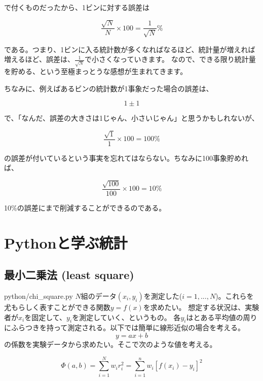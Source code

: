 \documentclass[uplatex]{jreport}
\begin{document}
で付くものだったから、1ビンに対する誤差は

\begin{equation}
  \frac{\sqrt{N}}{N}\times 100 = \frac{1}{\sqrt{N}} \%
\end{equation}

である。つまり、1ビンに入る統計数が多くなればなるほど、統計量が増えれば増えるほど、誤差は、$\frac{1}{\sqrt{N}}$で小さくなっていきます。
なので、できる限り統計量を貯める、という至極まっとうな感想が生まれてきます。

ちなみに、例えばあるビンの統計数が1事象だった場合の誤差は、

\begin{equation}
  1\pm 1
\end{equation}

で、「なんだ、誤差の大きさは1じゃん、小さいじゃん」と思うかもしれないが、

\begin{equation}
  \frac{\sqrt{1}}{1}\times 100 = 100 \%
\end{equation}

の誤差が付いているという事実を忘れてはならない。ちなみに100事象貯めれば、

\begin{equation}
  \frac{\sqrt{100}}{100}\times 100 = 10 \%
\end{equation}

10\%の誤差にまで削減することができるのである。



\chapter{Pythonと学ぶ統計}
\section{最小二乗法 (least square)}
python/chi\_square.py
$N$組のデータ$(x_i,y_i)$を測定した($i=1,...,N$)。これらを尤もらしく表すことができる関数$y=f(x)$を求めたい。
想定する状況は、実験者が$x_i$を固定して、$y_i$を測定していく、というもの。
各$y_i$はとある平均値の周りにふらつきを持って測定される。以下では簡単に線形近似の場合を考える。
\begin{equation}
  y = ax + b
\end{equation}
の係数を実験データから求めたい。そこで次のような値を考える。

\begin{equation}
  \Phi(a,b) = \sum_{i=1}^{N} w_i r_i^{2} = \sum_{i=1}^{n} w_i[f(x_i)-y_i]^2
\end{equation}
\end{document}
